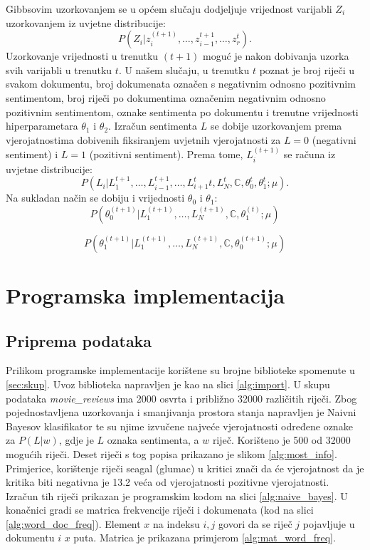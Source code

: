 Gibbsovim uzorkovanjem se u općem slučaju dodjeljuje vrijednost varijabli $Z_i$ uzorkovanjem iz uvjetne distribucije:
\begin{equation}
P(Z_i | z_i^{(t+1)}, \dots, z_{i-1}^{t+1}, \dots , z_r^{t}).
\end{equation}
Uzorkovanje vrijednosti u trenutku $(t+1)$ moguć je nakon dobivanja uzorka svih varijabli u trenutku $t$. U našem slučaju, u trenutku $t$ poznat je broj riječi u svakom dokumentu, broj dokumenata označen s negativnim odnosno pozitivnim sentimentom, broj riječi po dokumentima označenim negativnim odnosno pozitivnim sentimentom, oznake sentimenta po dokumentu i trenutne vrijednosti hiperparametara $\theta_1$ i $\theta_2$. Izračun sentimenta $L$ se dobije uzorkovanjem prema vjerojatnostima dobivenih fiksiranjem uvjetnih vjerojatnosti za $L=0$ (negativni sentiment) i $L=1$ (pozitivni sentiment). Prema tome, $L_{i}^{(t+1)}$ se računa iz uvjetne distribucije:
\begin{equation}
P(L_i|L_{1}^{t+1}, \dots , L_{i-1}^{t+1}, \dots , L_{i+1}^t{t}, L_{N}^{t},\mathbb{C}, \theta_{0}^{t}, \theta_{1}^{t}; \mu).
\end{equation}
Na sukladan način se dobiju i vrijednosti $\theta_0$ i $\theta_1$:
\begin{equation}
P(\theta_{0}^{(t+1)}|L_{1}^{(t+1)},\dots , L_{N}^{(t+1)}, \mathbb{C}, \theta_{1}^{(t)};\mu)
\end{equation} 

\begin{equation}
P(\theta_{1}^{(t+1)}|L_{1}^{(t+1)},\dots , L_{N}^{(t+1)}, \mathbb{C}, \theta_{0}^{(t+1)};\mu)
\end{equation}

\section{Programska implementacija}

\subsection{Priprema podataka}

Prilikom programske implementacije korištene su brojne biblioteke spomenute u \ref{sec:skup}. Uvoz biblioteka napravljen je kao na slici \ref{alg:import}. U skupu podataka \textit{movie\_reviews} ima 2000 osvrta i približno 32000 različitih riječi. Zbog pojednostavljena uzorkovanja i smanjivanja prostora stanja napravljen je Naivni Bayesov klasifikator te su njime izvučene najveće vjerojatnosti određene oznake za $P(L|w)$, gdje je $L$ oznaka sentimenta, a $w$ riječ. Korišteno je 500 od 32000 mogućih riječi. Deset riječi s tog popisa prikazano je slikom \ref{alg:most_info}. Primjerice, korištenje riječi seagal (glumac) u kritici znači da će vjerojatnost da je kritika biti negativna je 13.2 veća od vjerojatnosti pozitivne vjerojatnosti. Izračun tih riječi prikazan je programskim kodom na slici \ref{alg:naive_bayes}. U konačnici gradi se matrica frekvencije riječi i dokumenata (kod na slici \ref{alg:word_doc_freq}). Element $x$ na indeksu $i,j$ govori da se riječ $j$ pojavljuje u dokumentu $i$ $x$ puta. Matrica je prikazana primjerom \ref{alg:mat_word_freq}.


